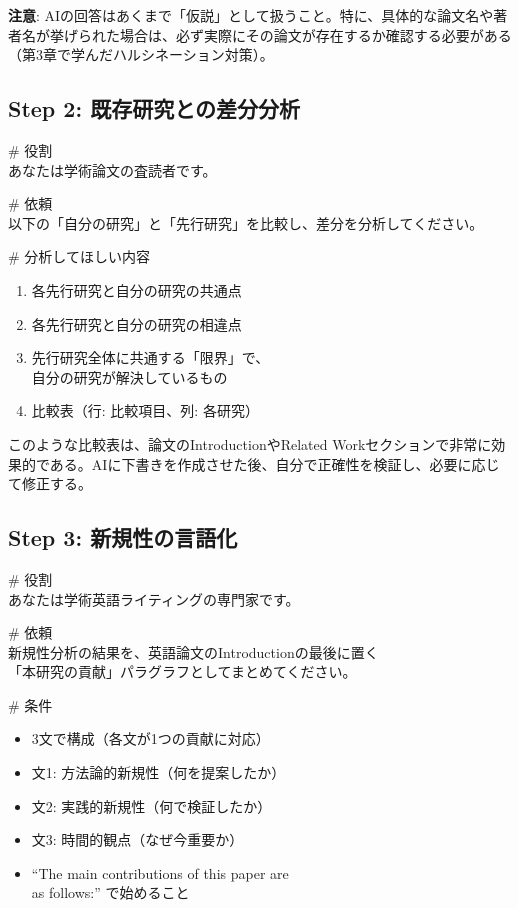 \textbf{注意}: AIの回答はあくまで「仮説」として扱うこと。特に、具体的な論文名や著者名が挙げられた場合は、必ず実際にその論文が存在するか確認する必要がある（第3章で学んだハルシネーション対策）。

\subsection{Step 2: 既存研究との差分分析}

\begin{promptbox}
\# 役割\\
あなたは学術論文の査読者です。

\# 依頼\\
以下の「自分の研究」と「先行研究」を比較し、差分を分析してください。

\# 分析してほしい内容
\begin{enumerate}
\item 各先行研究と自分の研究の共通点
\item 各先行研究と自分の研究の相違点
\item 先行研究全体に共通する「限界」で、\\
自分の研究が解決しているもの
\item 比較表（行: 比較項目、列: 各研究）
\end{enumerate}
\end{promptbox}

このような比較表は、論文のIntroductionやRelated Workセクションで非常に効果的である。AIに下書きを作成させた後、自分で正確性を検証し、必要に応じて修正する。

\subsection{Step 3: 新規性の言語化}

\begin{promptbox}
\# 役割\\
あなたは学術英語ライティングの専門家です。

\# 依頼\\
新規性分析の結果を、英語論文のIntroductionの最後に置く\\
「本研究の貢献」パラグラフとしてまとめてください。

\# 条件
\begin{itemize}
\item 3文で構成（各文が1つの貢献に対応）
\item 文1: 方法論的新規性（何を提案したか）
\item 文2: 実践的新規性（何で検証したか）
\item 文3: 時間的観点（なぜ今重要か）
\item ``The main contributions of this paper are\\
as follows:'' で始めること
\end{itemize}
\end{promptbox}

